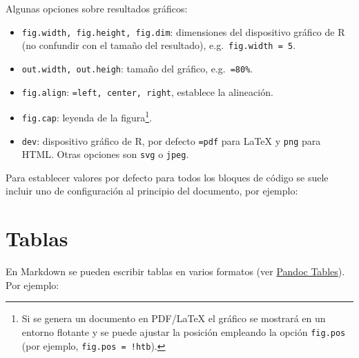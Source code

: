 \documentclass[
]{book}
\newenvironment{Shaded}{\begin{snugshade}}{\end{snugshade}}
\newcommand{\InformationTok}[1]{\textcolor[rgb]{0.56,0.35,0.01}{\textbf{\textit{#1}}}}
\providecommand{\tightlist}{%
  \setlength{\itemsep}{0pt}\setlength{\parskip}{0pt}}
\theoremstyle{break}
\theoremstyle{nonumberplain}
\begin{document}
Algunas opciones sobre resultados gráficos:

\begin{itemize}
\tightlist
\item
  \texttt{fig.width,\ fig.height,\ fig.dim}: dimensiones del dispositivo gráfico de R
  (no confundir con el tamaño del resultado), e.g.~\texttt{fig.width\ =\ 5}.
\item
  \texttt{out.width,\ out.heigh}: tamaño del gráfico, e.g.~\texttt{=\textquotesingle{}80\%\textquotesingle{}}.
\item
  \texttt{fig.align}: \texttt{=\textquotesingle{}left\textquotesingle{},\ \textquotesingle{}center\textquotesingle{},\ \textquotesingle{}right\textquotesingle{}}, establece la alineación.
\item
  \texttt{fig.cap}: leyenda de la figura\footnote{Si se genera un documento en PDF/LaTeX el gráfico
    se mostrará en un entorno flotante y se puede ajustar la posición empleando la opción
    \texttt{fig.pos} (por ejemplo, \texttt{fig.pos\ =\ \textquotesingle{}!htb\textquotesingle{}}).}.
\item
  \texttt{dev}: dispositivo gráfico de R, por defecto \texttt{=\textquotesingle{}pdf\textquotesingle{}} para LaTeX y \texttt{\textquotesingle{}png\textquotesingle{}} para HTML.
  Otras opciones son \texttt{\textquotesingle{}svg\textquotesingle{}} o \texttt{\textquotesingle{}jpeg\textquotesingle{}}.
\end{itemize}

Para establecer valores por defecto para todos los bloques de código
se suele incluir uno de configuración al principio del documento, por ejemplo:

\begin{Shaded}
\end{Shaded}

\hypertarget{tablas}{%
\section{Tablas}\label{tablas}}

En Markdown se pueden escribir tablas en varios formatos (ver \href{https://pandoc.org/MANUAL.html\#tables}{Pandoc Tables}).
Por ejemplo:
\end{document}
